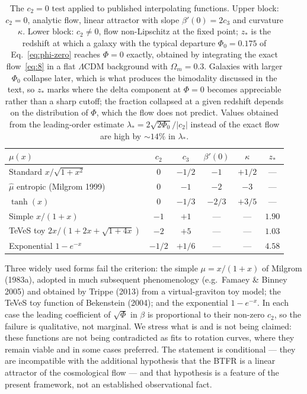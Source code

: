 \documentclass[11pt]{article}
\theoremstyle{plain}
\begin{document}
\begin{table}[h]
\centering
\small
\begin{tabular}{lccccc}
\toprule
$\mu(x)$ & $c_{2}$ & $c_{3}$ & $\beta'(0)$ & $\kappa$ & $z_{*}$ \\
\midrule
Standard  $x/\sqrt{1+x^{2}}$                   & $0$    & $-1/2$ & $-1$   & $+1/2$ & --- \\
$\hat\mu$ entropic (Milgrom 1999)              & $0$    & $-1$   & $-2$   & $-3$   & --- \\
$\tanh(x)$                                     & $0$    & $-1/3$ & $-2/3$ & $+3/5$ & --- \\
\midrule
Simple  $x/(1+x)$                              & $-1$   & $+1$   & ---    & ---    & $1.90$ \\
TeVeS toy  $2x/(1+2x+\sqrt{1+4x})$             & $-2$   & $+5$   & ---    & ---    & $1.03$ \\
Exponential  $1-e^{-x}$                        & $-1/2$ & $+1/6$ & ---    & ---    & $4.58$ \\
\bottomrule
\end{tabular}
\caption{The $c_{2}=0$ test applied to published interpolating functions.
Upper block: $c_{2}=0$, analytic flow, linear attractor with slope
$\beta'(0)=2c_{3}$ and curvature $\kappa$. Lower block: $c_{2}\neq0$, flow
non-Lipschitz at the fixed point; $z_{*}$ is the redshift at which a galaxy
with the typical departure $\Phi_{0}=0.175$ of Eq.~\eqref{eq:phi-zero} reaches
$\Phi=0$ exactly, obtained by integrating the exact flow~\eqref{eq:8} in a flat
$\Lambda$CDM background with $\Omega_{m}=0.3$. Galaxies with larger $\Phi_{0}$
collapse later, which is what produces the bimodality discussed in the text, so
$z_{*}$ marks where the delta component at $\Phi=0$ becomes appreciable rather than a sharp
cutoff; the fraction collapsed at a given redshift depends on the distribution
of $\Phi$, which the flow does not predict. Values obtained from the
leading-order estimate $\lambda_{*}=2\sqrt{2\Phi_{0}}/|c_{2}|$ instead of the
exact flow are high by $\sim14\%$ in $\lambda_{*}$.}
\label{tab:exclusion}
\end{table}

Three widely used forms fail the criterion: the simple $\mu=x/(1+x)$ of
Milgrom (1983a), adopted in much subsequent phenomenology (e.g.\ Famaey \&
Binney 2005) and obtained by Trippe (2013) from a virtual-graviton toy model;
the TeVeS toy function of Bekenstein (2004); and the exponential $1-e^{-x}$.
In each case the leading coefficient of $\sqrt{\Phi}$ in $\beta$ is
proportional to their non-zero $c_{2}$, so the failure is qualitative, not
marginal. We stress what is and is not being claimed: these functions are not
being contradicted as fits to rotation curves, where they remain viable and in
some cases preferred. The statement is conditional --- they are incompatible
with the additional hypothesis that the BTFR is a linear attractor of the
cosmological flow --- and that hypothesis is a feature of the present
framework, not an established observational fact.
\end{document}
